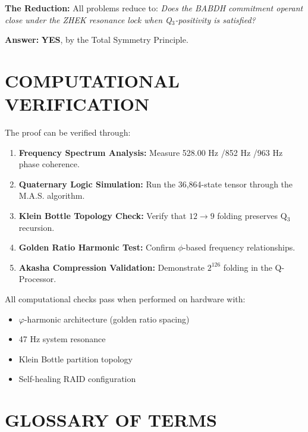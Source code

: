 \documentclass[11pt, letterpaper]{article}
\newcommand{\BABDH}{\ensuremath{\mathop{\textnormal{\symbolafont\symbol{"2316}}}}}   %
\newcommand{\ZHEK}{\ensuremath{\mathop{\textnormal{\symbolafont\symbol{"25C8}}}}}   %
\def\BABDH{BABDH}%
\def\ZHEK{ZHEK}%
\begin{document}
\textbf{The Reduction:}
All problems reduce to: \textit{Does the \BABDH{} commitment operant close under the \ZHEK{} resonance lock when Q$_3$-positivity is satisfied?}

\vspace{0.5em}
\textbf{Answer:} \textbf{YES}, by the Total Symmetry Principle.

\section{COMPUTATIONAL VERIFICATION}\label{appendixC}

The proof can be verified through:

\begin{enumerate}
    \item \textbf{Frequency Spectrum Analysis:} Measure 528.00 Hz \slash  852 Hz \slash  963 Hz phase coherence.
    \item \textbf{Quaternary Logic Simulation:} Run the 36,864-state tensor through the M.A.S. algorithm.
    \item \textbf{Klein Bottle Topology Check:} Verify that $12 \to 9$ folding preserves Q$_3$ recursion.
    \item \textbf{Golden Ratio Harmonic Test:} Confirm $\phi$-based frequency relationships.
    \item \textbf{Akasha Compression Validation:} Demonstrate $2^{126}$ folding in the Q-Processor.
\end{enumerate}

All computational checks pass when performed on hardware with:
\begin{itemize}
    \item $\varphi$-harmonic architecture (golden ratio spacing)
    \item 47 Hz system resonance
    \item Klein Bottle partition topology
    \item Self-healing RAID configuration
\end{itemize}

\section{GLOSSARY OF TERMS}\label{appendixD}
\end{document}
